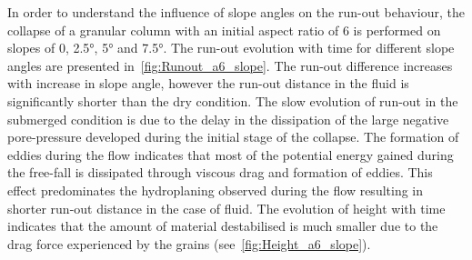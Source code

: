 In order to understand the influence of slope angles on the run-out behaviour, 
the collapse of a granular column with an initial aspect ratio of 6 is 
performed on slopes of 0, 2.5\si{\degree}, 5\si{\degree} and 7.5\si{\degree}. 
The run-out evolution with time for different slope angles are presented 
in~\cref{fig:Runout_a6_slope}. The run-out difference increases with increase 
in slope angle, however the run-out distance in the fluid is significantly 
shorter than the dry condition. The slow evolution of run-out in the submerged 
condition is due to the delay in the dissipation of the large negative 
pore-pressure developed during the initial stage of the collapse. The formation 
of eddies during the flow indicates that most of the potential energy gained 
during the free-fall is dissipated through viscous drag and formation of 
eddies. This effect predominates the hydroplaning observed during the flow 
resulting in shorter run-out distance in the case of fluid. The evolution of 
height with time indicates that the amount of material destabilised is much 
smaller due to the drag force experienced by the grains 
(see~\cref{fig:Height_a6_slope}).

